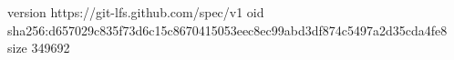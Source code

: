 version https://git-lfs.github.com/spec/v1
oid sha256:d657029c835f73d6c15c8670415053eec8ec99abd3df874c5497a2d35cda4fe8
size 349692
